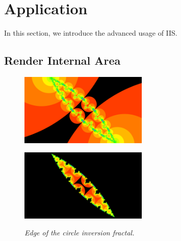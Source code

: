 

\section{Application}

In this section, we introduce the advanced usage of IIS.

\subsection{Render Internal Area}

\begin{figure}[htbp]
 \begin{minipage}[t]{0.5\hsize}
  \center
  \includegraphics[height=1.35in, keepaspectratio]{img/application/internal/schottky.png}
  \subcaption{\textit{}}
  \label{fig:schottkyAll}
  \hspace*{\fill}
 \end{minipage}
 \begin{minipage}[t]{0.5\hsize}
  \center
  \includegraphics[height=1.35in, keepaspectratio]{img/application/internal/schottkyEdge.png}
  \subcaption{\textit{}}
  \label{fig:schottkyEdge}
  \hspace*{\fill}
 \end{minipage}
 \caption{\textit{Edge of the circle inversion fractal.}}
 \label{fig:schottkyDivide}
\end{figure}

